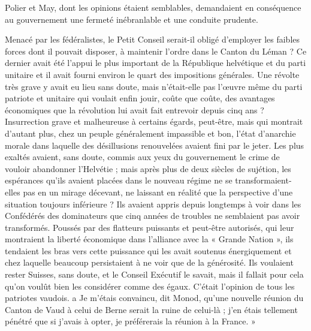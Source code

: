 \documentclass[french,twoside]{book} %
\begin{document}
\noindent Polier et May, dont les opinions étaient semblables, demandaient en conséquence au gouvernement une fermeté inébranlable et une conduite prudente.\par
Menacé par les fédéralistes, le Petit Conseil serait-il obligé d’employer les faibles forces dont il pouvait disposer, à maintenir l’ordre dans le Canton du Léman ? Ce dernier avait été l’appui le plus important de la République helvétique et du parti unitaire et il avait fourni environ le quart des impositions générales. Une révolte très grave y avait eu lieu sans doute, mais n’était-elle pas l’œuvre même du parti patriote et unitaire qui voulait enfin jouir, coûte que coûte, des avantages économiques que la révolution lui avait fait entrevoir depuis cinq ans ? Insurrection grave et malheureuse à certains égards, peut-être, mais qui montrait d’autant plus, chez un peuple généralement impassible et bon, l’état d’anarchie morale dans laquelle des désillusions renouvelées avaient fini par le jeter. Les plus exaltés avaient, sans doute, commis aux yeux du gouvernement le crime de vouloir abandonner l’Helvétie ; mais après plus de deux siècles de sujétion, les espérances qu’ils avaient placées dans le nouveau régime ne se transformaient-elles pas en un mirage décevant, ne laissant en réalité que la perspective d’une situation toujours inférieure ? Ils avaient appris depuis longtemps à voir dans les Confédérés des dominateurs que cinq années de troubles ne semblaient pas avoir transformés. Poussés par des flatteurs puissants et peut-être autorisés, qui leur montraient la liberté économique dans l’alliance avec la « Grande Nation », ils tendaient les bras vers cette puissance qui les avait soutenus énergiquement et chez laquelle beaucoup persistaient à ne voir que de la générosité. Ils voulaient rester Suisses, sans doute, et le Conseil Exécutif le savait, mais il fallait pour cela qu’on voulût bien les considérer comme des égaux. C’était l’opinion de tous les patriotes vaudois. a Je m’étais convaincu, dit Monod, qu’une nouvelle réunion du Canton de Vaud à celui de Berne serait la ruine de celui-là ; j’en étais tellement pénétré que si j’avais à opter, je préférerais la réunion à la France. »\par
\end{document}
